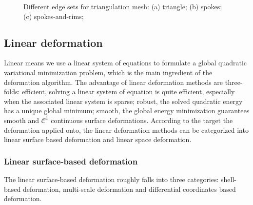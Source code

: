\begin{figure}[!h]
\centering
 \caption{Different edge sets for triangulation mesh: (a) triangle; (b) spokes; (c) spokes-and-rims;}
 \label{fig:cell}
\end{figure}

\subsection{Linear deformation}
Linear means we use a linear system of equations to formulate a global quadratic variational minimization problem, which is the main ingredient of the deformation algorithm. The advantage of linear deformation methods are three-folds: efficient, solving a linear system of equation is quite efficient, especially when the associated linear system is sparse; robust, the solved quadratic energy has a unique global minimum; smooth, the global energy minimization guarantees smooth and $\mathcal{C}^1$ continuous surface deformations. According to the target the deformation applied onto, the linear deformation methods can be categorized into linear surface based deformation and linear space deformation.

\subsubsection{Linear surface-based deformation}
The linear surface-based deformation roughly falls into three categories: shell-based deformation, multi-scale deformation and differential coordinates based deformation.

